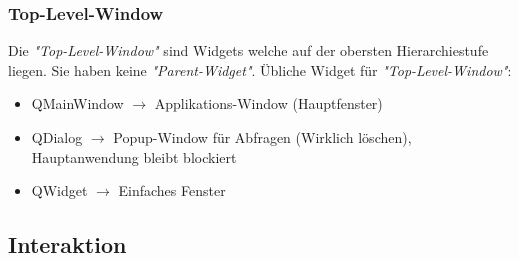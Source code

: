 \subsubsection{Top-Level-Window}
Die \textit{"Top-Level-Window"} sind Widgets welche auf der obersten Hierarchiestufe liegen. Sie haben keine \textit{"Parent-Widget"}.
Übliche Widget für \textit{"Top-Level-Window"}: 
\begin{itemize}
	\item QMainWindow $\rightarrow$ Applikations-Window (Hauptfenster)
	\item QDialog $\rightarrow$ Popup-Window für Abfragen (Wirklich löschen), Hauptanwendung bleibt blockiert
	\item QWidget $\rightarrow$ Einfaches Fenster
\end{itemize}

\subsection{Interaktion}
